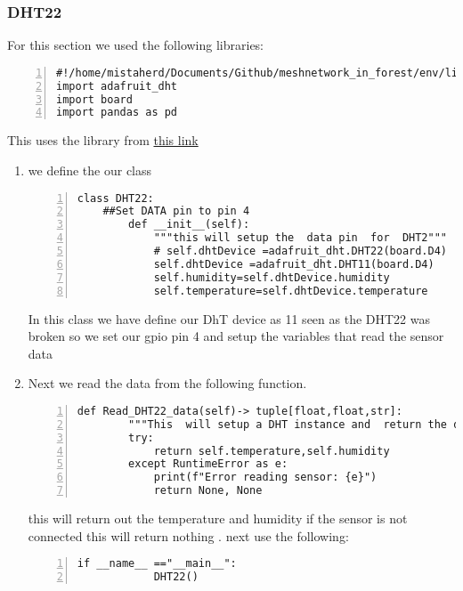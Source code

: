 \subsubsection{DHT22}
For this section we used the following libraries:
\begin{lstlisting}[style=mystyle,numbers=left,firstnumber=1]
#!/home/mistaherd/Documents/Github/meshnetwork_in_forest/env/lib/python3.11
import adafruit_dht 
import board
import pandas as pd  
\end{lstlisting} 
This uses the library from \href{https://github.com/mrmcwethy/Adafruit_CircuitPython_DHT}{this link}
\begin{enumerate}
    \item we define the our class
    \begin{lstlisting}[style=mystyle,numbers=left,firstnumber=1]
    class DHT22:
    ##Set DATA pin to pin 4
        def __init__(self):
            """this will setup the  data pin  for  DHT2"""
            # self.dhtDevice =adafruit_dht.DHT22(board.D4)
            self.dhtDevice =adafruit_dht.DHT11(board.D4)
            self.humidity=self.dhtDevice.humidity
            self.temperature=self.dhtDevice.temperature
    \end{lstlisting}
    In this class we have  define our DhT device as 11 seen as the DHT22 was  broken
    so we set  our gpio pin 4 and setup the variables that read the  sensor data
    \item Next we read the data from the following function.
    \begin{lstlisting}[style=mystyle,numbers=left,firstnumber=1]
        def Read_DHT22_data(self)-> tuple[float,float,str]:
        """This  will setup a DHT instance and  return the data from the sensor"""
        try:
            return self.temperature,self.humidity
        except RuntimeError as e:
            print(f"Error reading sensor: {e}")
            return None, None
    \end{lstlisting}
    this will  return out the  temperature and humidity if the sensor is not connected
    this  will return nothing . next  use the following: 
    \begin{lstlisting}[style=mystyle,numbers=left,firstnumber=1]
        if __name__ =="__main__":
            DHT22()
    \end{lstlisting}
\end{enumerate}
